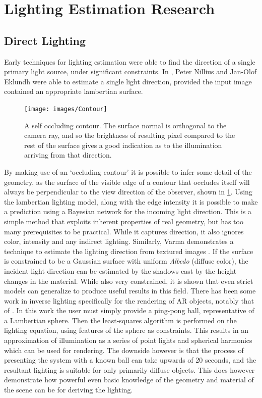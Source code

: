 \documentclass[ %
                    author={Gavin Parker},
                supervisor={Dr. Neill Campbell},
                    degree={MEng},
                     title={Deep Learning for Illumination Estimation from Stereo Images},
                  subtitle={},
                      type={Research},
                      year={2018} ]{dissertation}
\begin{document}
\section{Lighting Estimation Research}
\subsection{Direct Lighting}
Early techniques for lighting estimation were able to find the direction of a single primary light source, under significant constraints. In \cite{990650}, Peter Nillius and Jan-Olof Eklundh were able to estimate a single light direction, provided the input image contained an appropriate lambertian surface.
\begin{figure}
\texttt{[image: images/Contour]}
\centering
\label{fig:contour}
\caption{A self occluding contour. The surface normal is orthogonal to the camera ray, and so the brightness of resulting pixel compared to the rest of the surface gives a good indication as to the illumination arriving from that direction.}
\end{figure}
By making use of an `occluding contour' it is possible to infer some detail of the geometry, as the surface of the visible edge of a contour that occludes itself will always be perpendicular to the view direction of the observer, shown in \ref{fig:contour}. Using the lambertian lighting model, along with the edge intensity it is possible to make a prediction using a Bayesian network for the incoming light direction. This is a simple method that exploits inherent properties of real geometry, but has too many prerequisites to be practical. While it captures direction, it also ignores color, intensity and any indirect lighting. Similarly, Varma demonstrates a technique to estimate the lighting direction from textured images \cite{1315030}. If the surface is constrained to be a Gaussian surface with uniform \textit{Albedo} (diffuse color), the incident light direction can be estimated by the shadows cast by the height changes in the material. While also very constrained, it is shown that even strict models can generalize to produce useful results in this field.
\newline
There has been some work in inverse lighting specifically for the rendering of AR objects, notably that of \cite{Aittala2010}. In this work the user must simply provide a ping-pong ball, representative of a Lambertian sphere. Then the least-squares algorithm is performed on the lighting equation, using features of the sphere as constraints. This results in an approximation of illumination as a series of point lights and spherical harmonics which can be used for rendering. The downside however is that the process of presenting the system with a known ball can take upwards of 20 seconds, and the resultant lighting is suitable for only primarily diffuse objects. This does however demonstrate how powerful even basic knowledge of the geometry and material of the scene can be for deriving the lighting.
\end{document}
